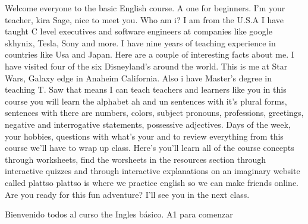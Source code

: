 Welcome everyone to the basic English course. A one for beginners. I'm your teacher, kira Sage, nice to meet you. Who am i? I am from the U.S.A I have taught C level executives and software engineers at companies like google skhynix, Tesla, Sony and more. I have nine years of teaching experience in countries like Usa and Japan. Here are a couple of interesting facts about me. I have visited four of the six Disneyland's around the world. This is me at Star Wars, Galaxy edge in Anaheim California. Also i have Master's degree in teaching T. Saw that means I can teach teachers and learners like you in this course you will learn the alphabet ah and un sentences with it's plural forms, sentences with there are numbers, colors, subject pronouns, professions, greetings, negative and interrogative statements, possessive adjectives. Days of the week, your hobbies, questions with what's your and to review everything from this course we'll have to wrap up class. Here's you'll learn all of the course concepts through worksheets, find the worsheets in the resources section through interactive quizzes and through interactive explanations on an imaginary website called plattso plattso is where we practice english so we can make friends online. Are you ready for this  fun adventure? I'll see you in the next class.


Bienvenido todos al curso the Ingles b\'asico. A1 para comenzar 



